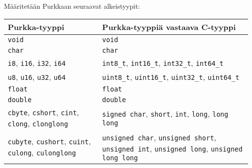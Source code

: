 Määritetään Purkkaan seuraavat alkeistyypit: \\[0.3cm]
\begin{tabular}{@{}p{5.8cm}p{8.7cm}@{}} \toprule
    Purkka-tyyppi & Purkka-tyyppiä vastaava C-tyyppi \\ \midrule
    \texttt{void} & \texttt{void} \\
    \texttt{char} & \texttt{char} \\
    \texttt{i8}, \texttt{i16}, \texttt{i32}, \texttt{i64} &
    \texttt{int8\_t}, \texttt{int16\_t}, \texttt{int32\_t}, \texttt{int64\_t} \\
    \texttt{u8}, \texttt{u16}, \texttt{u32}, \texttt{u64} &
    \texttt{uint8\_t}, \texttt{uint16\_t}, \texttt{uint32\_t}, \texttt{uint64\_t} \\
    \texttt{float} & \texttt{float} \\
    \texttt{double} & \texttt{double} \\
    [0.3cm]

    \texttt{cbyte}, \texttt{cshort}, \texttt{cint}, \texttt{clong}, \texttt{clonglong}
    & \texttt{signed char}, \texttt{short}, \texttt{int}, \texttt{long}, \texttt{long long} \\
    \noalign{\vspace{0.3cm}}%

    \texttt{cubyte}, \texttt{cushort}, \texttt{cuint}, \texttt{culong}, \texttt{culonglong}
    & \texttt{unsigned char}, \texttt{unsigned short}, \texttt{unsigned int},
      \texttt{unsigned long}, \texttt{unsigned long long} \\
    \bottomrule
\end{tabular} \\

